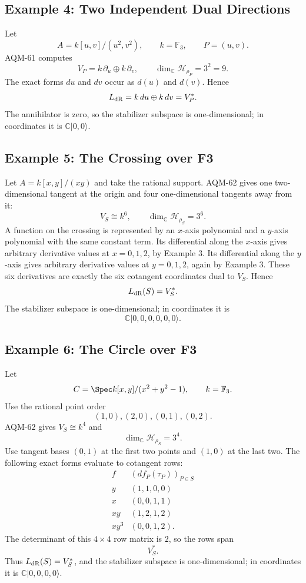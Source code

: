 \subsection{Example 4: Two Independent Dual Directions}

Let
\[
  A=k[u,v]/(u^2,v^2),\qquad k=\mathbb F_3,\qquad P=(u,v).
\]
AQM-61 computes
\[
  V_P=k\,\partial_u\oplus k\,\partial_v,\qquad
  \dim_{\mathbb C}\mathcal H_{\rho_P}=3^2=9.
\]
The exact forms \(du\) and \(dv\) occur as \(d(u)\) and \(d(v)\).  Hence
\[
  L_{\rm dR}=k\,du\oplus k\,dv=V_P^*.
\]
The annihilator is zero, so the stabilizer subspace is one-dimensional; in
coordinates it is \(\mathbb C|0,0\rangle\).

\subsection{Example 5: The Crossing over F3}

Let \(A=k[x,y]/(xy)\) and take the rational support.  AQM-62 gives one
two-dimensional tangent at the origin and four one-dimensional tangents away
from it:
\[
  V_S\cong k^6,\qquad
  \dim_{\mathbb C}\mathcal H_{\rho_S}=3^6.
\]
A function on the crossing is represented by an \(x\)-axis polynomial and a
\(y\)-axis polynomial with the same constant term.  Its differential along the
\(x\)-axis gives arbitrary derivative values at \(x=0,1,2\), by Example 3.
Its differential along the \(y\)-axis gives arbitrary derivative values at
\(y=0,1,2\), again by Example 3.  These six derivatives are exactly the six
cotangent coordinates dual to \(V_S\).  Hence
\[
  L_{\rm dR}(S)=V_S^*.
\]
The stabilizer subspace is one-dimensional; in coordinates it is
\[
  \mathbb C|0,0,0,0,0,0\rangle.
\]

\subsection{Example 6: The Circle over F3}

Let
\[
  C=\Spec k[x,y]/(x^2+y^2-1),\qquad k=\mathbb F_3.
\]
Use the rational point order
\[
  (1,0),(2,0),(0,1),(0,2).
\]
AQM-62 gives \(V_S\cong k^4\) and
\[
  \dim_{\mathbb C}\mathcal H_{\rho_S}=3^4.
\]
Use tangent bases \((0,1)\) at the first two points and \((1,0)\) at the last
two.  The following exact forms evaluate to cotangent rows:
\[
\begin{array}{c|c}
f & (df_P(\tau_P))_{P\in S}\\ \hline
y & (1,1,0,0)\\
x & (0,0,1,1)\\
xy & (1,2,1,2)\\
xy^3 & (0,0,1,2).
\end{array}
\]
The determinant of this \(4\times4\) row matrix is \(2\), so the rows span
\[
  V_S^*.
\]
Thus \(L_{\rm dR}(S)=V_S^*\), and the stabilizer subspace is one-dimensional;
in coordinates it is \(\mathbb C|0,0,0,0\rangle\).

